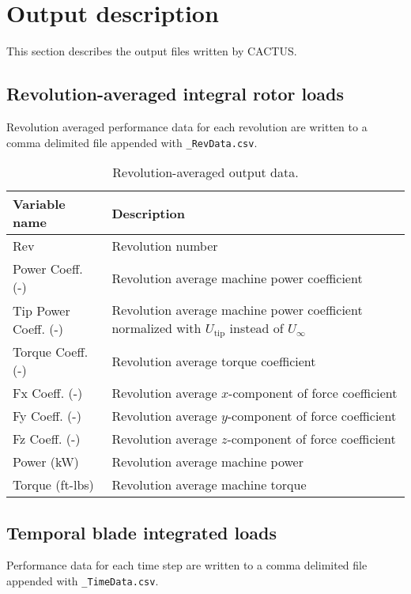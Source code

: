 \chapter{Output description}
This section describes the output files written by CACTUS.

\section{Revolution-averaged integral rotor loads}
Revolution averaged performance data for each revolution are written to a comma delimited file appended with \texttt{\_RevData.csv}.

\begin{table}[!htbp]
\centering
\caption{Revolution-averaged output data.}
\label{tbl:output_vars_rev}
\begin{tabular}{p{}p{}}
\toprule
Variable name & Description \\ \midrule
Rev                    & Revolution number \\
Power Coeff. (-)       & Revolution average machine power coefficient \\
Tip Power Coeff. (-)   & Revolution average machine power coefficient normalized with $U_\textrm{tip}$ instead of $U_\infty$ \\
Torque Coeff. (-)      & Revolution average torque coefficient \\
Fx Coeff. (-)          & Revolution average $x$-component of force coefficient \\
Fy Coeff. (-)          & Revolution average $y$-component of force coefficient \\
Fz Coeff. (-)          & Revolution average $z$-component of force coefficient \\
Power (kW)             & Revolution average machine power \\
Torque (ft-lbs)        & Revolution average machine torque \\
\bottomrule
\end{tabular}
\end{table}

\section{Temporal blade integrated loads}
Performance data for each time step are written to a comma delimited file appended with \texttt{\_TimeData.csv}.

